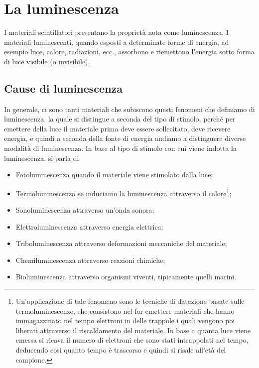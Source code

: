 \section{La luminescenza}

I materiali scintillatori presentano la proprietà nota come luminescenza. I materiali luminescenti, quando esposti a determinate forme di energia, ad esempio luce, calore, radiazioni, ecc., assorbono e riemettono l'energia sotto forma di luce visibile (o invisibile).

\subsection{Cause di luminescenza}

In generale, ci sono tanti materiali che subiscono questi fenomeni che definiamo di luminescenza, la quale si distingue a seconda del tipo di stimolo, perché per emettere della luce il materiale prima deve essere sollecitato, deve ricevere energia, e quindi a seconda della fonte di energia andiamo a distinguere diverse modalità di luminescenza. In base al tipo di stimolo con cui viene indotta la luminescenza, si parla di

\begin{itemize}[leftmargin=0.5cm]
   \item Fotoluminescenza quando il materiale viene stimolato dalla luce;
   \item Termoluminescenza se induciamo la luminescenza attraverso il calore\footnote{Un'applicazione di tale fenomeno sono le tecniche di datazione basate sulle termoluminescenze, che consistono nel far emettere materiali che hanno immagazzinato nel tempo elettroni in delle trappole i quali vengono poi liberati attraverso il riscaldamento del materiale. In base a quanta luce viene emessa si ricava il numero di elettroni che sono stati intrappolati nel tempo, deducendo così quanto tempo è trascorso e quindi si risale all'età del campione.};
   \item Sonoluminescenza attraverso un'onda sonora;
   \item Elettroluminescenza attraverso energia elettrica;
   \item Triboluminescenza attraverso deformazioni meccaniche del materiale;
   \item Chemiluminescenza attraverso reazioni chimiche;
   \item Bioluminescenza attraverso organismi viventi, tipicamente quelli marini.%
\end{itemize}

